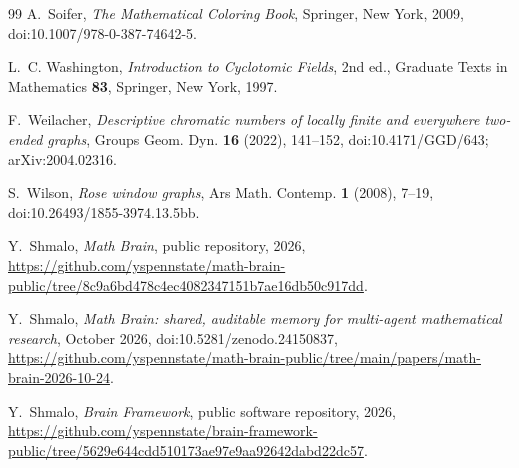 \documentclass[11pt]{amsart}
\theoremstyle{remark}
\numberwithin{equation}{section}
\begin{document}
\begin{thebibliography}{99}
A.~Soifer, \emph{The Mathematical Coloring Book}, Springer, New York,
2009, doi:10.1007/978-0-387-74642-5.

L.~C. Washington, \emph{Introduction to Cyclotomic Fields}, 2nd ed.,
Graduate Texts in Mathematics \textbf{83}, Springer, New York, 1997.

F.~Weilacher, \emph{Descriptive chromatic numbers of locally finite and
everywhere two-ended graphs}, Groups Geom. Dyn. \textbf{16} (2022),
141--152, doi:10.4171/GGD/643; arXiv:2004.02316.

S.~Wilson, \emph{Rose window graphs}, Ars Math. Contemp. \textbf{1}
(2008), 7--19, doi:10.26493/1855-3974.13.5bb.

 Y.~Shmalo, \emph{Math Brain}, public repository, 2026, \url{https://github.com/yspennstate/math-brain-public/tree/8c9a6bd478c4ec4082347151b7ae16db50c917dd}.

 Y.~Shmalo, \emph{Math Brain: shared, auditable memory for multi-agent mathematical research}, October 2026, doi:10.5281/zenodo.24150837,
\url{https://github.com/yspennstate/math-brain-public/tree/main/papers/math-brain-2026-10-24}.

 Y.~Shmalo, \emph{Brain Framework}, public software repository, 2026, \url{https://github.com/yspennstate/brain-framework-public/tree/5629e644cdd510173ae97e9aa92642dabd22dc57}.

\end{thebibliography}
\end{document}
